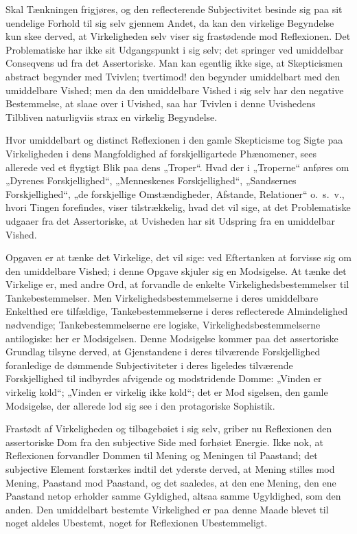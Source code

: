 \documentclass[12pt]{book}
\newcommand{\opage}[1]{\marginnote{\footnotesize\textit{[#1]}}}
\begin{document}
Skal Tænkningen frigjøres, og den reflecterende Subjectivitet besinde sig paa sit uendelige Forhold til sig selv gjennem Andet, da kan den virkelige Begyndelse kun skee derved,
\opage{213}at Virkeligheden selv viser sig frastødende mod Reflexionen. Det Problematiske har ikke sit Udgangspunkt i sig selv; det springer ved umiddelbar Conseqvens ud fra det Assertoriske. Man kan egentlig ikke sige, at Skepticismen abstract begynder med Tvivlen; tvertimod! den begynder umiddelbart med den umiddelbare Vished; men da den umiddelbare Vished i sig selv har den negative Bestemmelse, at slaae over i Uvished, saa har Tvivlen i denne Uvishedens Tilbliven naturligviis strax en virkelig Begyndelse.

Hvor umiddelbart og distinct Reflexionen i den gamle Skepticisme tog Sigte paa Virkeligheden i dens Mangfoldighed af forskjelligartede Phænomener, sees allerede ved et flygtigt Blik paa dens „Troper“. Hvad der i „Troperne“ anføres om „Dyrenes Forskjellighed“, „Menneskenes Forskjellighed“, „Sandsernes Forskjellighed“, „de forskjellige Omstændigheder, Afstande, Relationer“ o.\ s.\ v., hvori Tingen forefindes, viser tilstrækkelig, hvad det vil sige, at det Problematiske udgaaer fra det Assertoriske, at Uvisheden har sit Udspring fra en umiddelbar Vished.

Opgaven er at tænke det Virkelige, det vil sige: ved Eftertanken at forvisse sig om den umiddelbare Vished; i denne Opgave skjuler sig en Modsigelse. At tænke det Virkelige er, med andre Ord, at forvandle de enkelte Virkelighedsbestemmelser til Tankebestemmelser. Men Virkelighedsbestemmelserne i deres umiddelbare Enkelthed ere tilfældige, Tankebestemmelserne i deres reflecterede Almindelighed nødvendige; Tankebestemmelserne ere logiske, Virkelighedsbestemmelserne antilogiske: her er Modsigelsen. Denne Modsigelse kommer paa det assertoriske Grundlag tilsyne derved, at Gjenstandene i deres tilværende Forskjellighed foranledige de dømmende Subjectiviteter i deres ligeledes tilværende Forskjellighed til indbyrdes afvigende og modstridende Domme: „Vinden er virkelig kold“; „Vinden er virkelig ikke kold“; det er Mod%
\opage{214}sigelsen, den gamle Modsigelse, der allerede lod sig see i den protagoriske Sophistik.

Frastødt af Virkeligheden og tilbagebøiet i sig selv, griber nu Reflexionen den assertoriske Dom fra den subjective Side med forhøiet Energie. Ikke nok, at Reflexionen forvandler Dommen til Mening og Meningen til Paastand; det subjective Element forstærkes indtil det yderste derved, at Mening stilles mod Mening, Paastand mod Paastand, og det saaledes, at den ene Mening, den ene Paastand netop erholder samme Gyldighed, altsaa samme Ugyldighed, som den anden. Den umiddelbart bestemte Virkelighed er paa denne Maade blevet til noget aldeles Ubestemt, noget for Reflexionen Ubestemmeligt.
\end{document}

